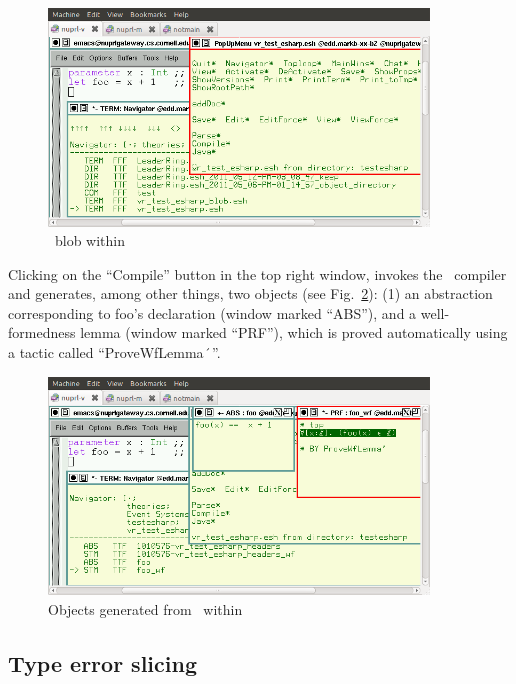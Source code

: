 \documentclass[final]{article}
\begin{document}
\begin{figure}[!t]
  \begin{center}
    \includegraphics[width=0.9\textwidth]{../images/Esharp-test}
  \end{center}
  \caption{\eml\ blob within \nuprl}
  \label{fig:esharp-test}
\end{figure}

Clicking on the ``Compile'' button in the top right window, invokes
the \eml\ compiler and generates, among other things, two objects
(see Fig.~\ref{fig:esharp-test-compile}): (1) an abstraction
corresponding to foo's declaration (window marked ``ABS''), and a
well-formedness lemma (window marked ``PRF''), which is proved
automatically using a tactic called ``ProveWfLemma$\char19$''.

\begin{figure}[!t]
  \begin{center}
    \includegraphics[width=0.9\textwidth]{../images/Esharp-test-compile}
  \end{center}
  \caption{Objects generated from \eml\ within \nuprl}
  \label{fig:esharp-test-compile}
\end{figure}


\subsection{Type error slicing}
\label{sec:tes}
\end{document}
